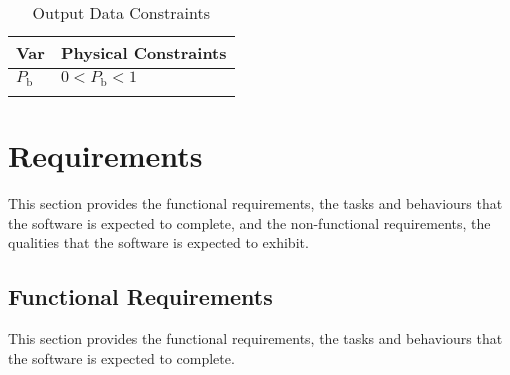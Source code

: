 \documentclass[12pt]{article}
\begin{document}
\begin{longtable}{l l}
\toprule
\textbf{Var} & \textbf{Physical Constraints}
\\
\midrule
\endhead
${P_{\text{b}}}$ & $0<{P_{\text{b}}}<1$
\\
\bottomrule
\caption{Output Data Constraints}
\label{Table:OutDataConstraints}
\end{longtable}
\section{Requirements}
\label{Sec:Requirements}
This section provides the functional requirements, the tasks and behaviours that the software is expected to complete, and the non-functional requirements, the qualities that the software is expected to exhibit.

\subsection{Functional Requirements}
\label{Sec:FRs}
This section provides the functional requirements, the tasks and behaviours that the software is expected to complete.
\end{document}
